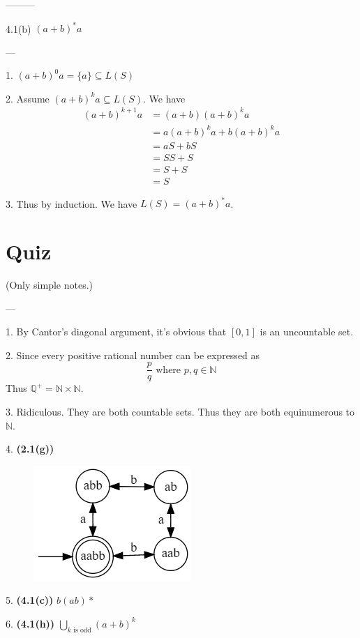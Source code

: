 \documentclass{article}
\begin{document}
\begin{tlist}{---------}
	\item[4.1(b)]
	$(a+b)^*a$
	\begin{tlist}{---}
		\item[1.] $(a+b)^0a=\{a\}\subseteq L(S)$
		\item[2.] Assume $(a+b)^ka\subseteq L(S)$. We have
		\begin{align*}
			(a+b)^{k+1}a & = (a+b)(a+b)^{k}a     \\
			             & = a(a+b)^ka+b(a+b)^ka \\
			             & = aS+bS               \\
			             & = SS+S                \\
			             & = S+S                 \\
			             & = S
		\end{align*}
		\item[3.] Thus by induction. We have $L(S)=(a+b)^*a$.
	\end{tlist}
\end{tlist}

\section{Quiz}
 (Only simple notes.)
\begin{tlist}{---}

	\item[1.]
	By Cantor's diagonal argument, it's obvious that $[0,1]$ is an uncountable set.

	\item[2.]
	Since every positive rational number can be expressed as
	$$\frac{p}{q} \text{ where } p,q\in\mathbb{N}$$
	Thus $\mathbb{Q}^+=\mathbb{N}\times\mathbb{N}$.

	\item[3.]
	Ridiculous. They are both countable sets. Thus they are both equinumerous to $\mathbb{N}$.

	\item[4.] {\bf(2.1(g))}
	\begin{figure}[H]\centering\includegraphics{2_1_g.png}\end{figure}

	\item[5.] {\bf(4.1(c))}
	$b(ab)*$
  
  \item[6.] {\bf(4.1(h))}
	$\displaystyle\bigcup_{k\text{ is odd}}(a+b)^k$

\end{tlist}
\end{document}
